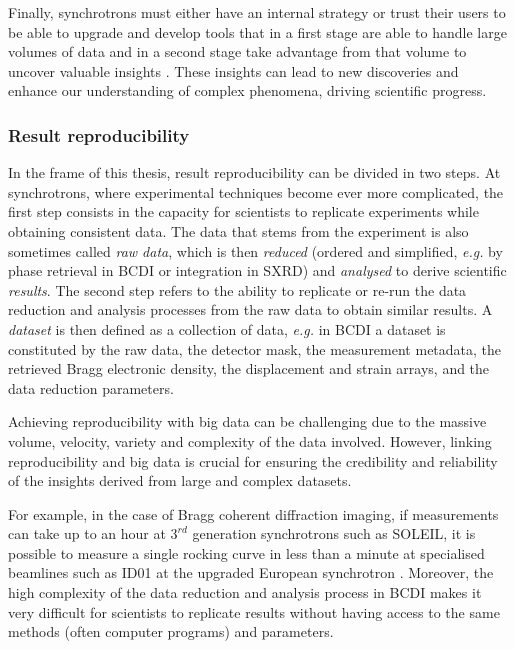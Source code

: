 Finally, synchrotrons must either have an internal strategy or trust their users to be able to upgrade and develop tools that in a first stage are able to handle large volumes of data and in a second stage take advantage from that volume to uncover valuable insights \parencite{Wang2016a, Khaleghi2019}.
These insights can lead to new discoveries and enhance our understanding of complex phenomena, driving scientific progress.


\subsubsection{Result reproducibility}

In the frame of this thesis, result reproducibility can be divided in two steps.
At synchrotrons, where experimental techniques become ever more complicated, the first step consists in the capacity for scientists to replicate experiments while obtaining consistent data.
The data that stems from the experiment is also sometimes called \textit{raw data}, which is then \textit{reduced} (ordered and simplified, \textit{e.g.} by phase retrieval in BCDI or integration in SXRD) and \textit{analysed} to derive scientific \textit{results}.
The second step refers to the ability to replicate or re-run the data reduction and analysis processes from the raw data to obtain similar results.
A \textit{dataset} is then defined as a collection of data, \textit{e.g.} in BCDI a dataset is constituted by the raw data, the detector mask, the measurement metadata, the retrieved Bragg electronic density, the displacement and strain arrays, and the data reduction parameters.

Achieving reproducibility with big data can be challenging due to the massive volume, velocity, variety and complexity of the data involved.
However, linking reproducibility and big data is crucial for ensuring the credibility and reliability of the insights derived from large and complex datasets.

For example, in the case of Bragg coherent diffraction imaging, if measurements can take up to an hour at $3^{rd}$ generation synchrotrons such as SOLEIL, it is possible to measure a single rocking curve in less than a minute at specialised beamlines such as ID01 at the upgraded European synchrotron \parencite{Richter2019}.
Moreover, the high complexity of the data reduction and analysis process in BCDI makes it very difficult for scientists to replicate results without having access to the same methods (often computer programs) and parameters.

